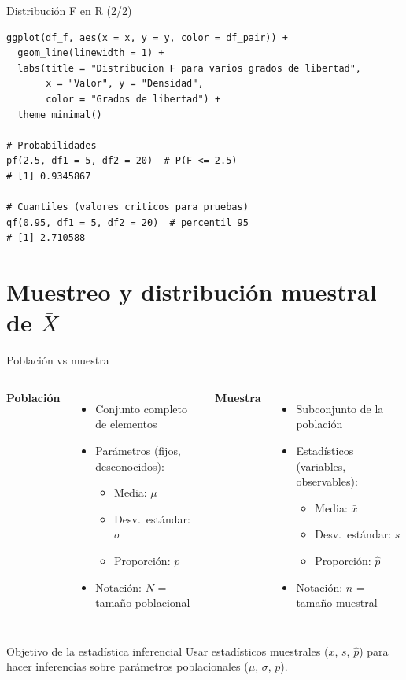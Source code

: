 \documentclass[aspectratio=169, 11pt]{beamer}
\begin{document}
\begin{frame}[fragile]{Distribución F en R (2/2)}
\begin{lstlisting}
ggplot(df_f, aes(x = x, y = y, color = df_pair)) +
  geom_line(linewidth = 1) +
  labs(title = "Distribucion F para varios grados de libertad",
       x = "Valor", y = "Densidad",
       color = "Grados de libertad") +
  theme_minimal()

# Probabilidades
pf(2.5, df1 = 5, df2 = 20)  # P(F <= 2.5)
# [1] 0.9345867

# Cuantiles (valores criticos para pruebas)
qf(0.95, df1 = 5, df2 = 20)  # percentil 95
# [1] 2.710588
\end{lstlisting}
\end{frame}

\section{Muestreo y distribución muestral de $\bar{X}$}

\begin{frame}{Población vs muestra}
\begin{columns}[T]
\textbf{Población}
\begin{itemize}
\item Conjunto completo de elementos
\item Parámetros (fijos, desconocidos):
  \begin{itemize}
  \item Media: $\mu$
  \item Desv.\ estándar: $\sigma$
  \item Proporción: $p$
  \end{itemize}
\item Notación: $N$ = tamaño poblacional
\end{itemize}

\textbf{Muestra}
\begin{itemize}
\item Subconjunto de la población
\item Estadísticos (variables, observables):
  \begin{itemize}
  \item Media: $\bar{x}$
  \item Desv.\ estándar: $s$
  \item Proporción: $\hat{p}$
  \end{itemize}
\item Notación: $n$ = tamaño muestral
\end{itemize}
\end{columns}

\vspace{0.5em}
\begin{block}{Objetivo de la estadística inferencial}
Usar estadísticos muestrales ($\bar{x}$, $s$, $\hat{p}$) para hacer inferencias sobre parámetros poblacionales ($\mu$, $\sigma$, $p$).
\end{block}
\end{frame}
\end{document}
